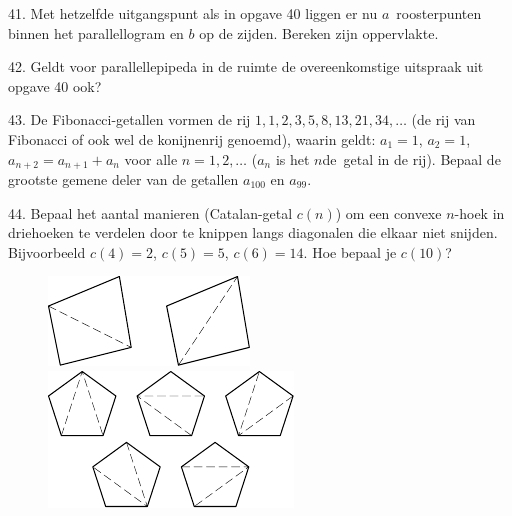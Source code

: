 \begin{problem}{41.}
	Met hetzelfde uitgangspunt als in opgave 40 liggen er nu $a$~roos\-terpunten binnen het parallellogram en $b$ op de zijden. Bereken zijn oppervlakte.
\end{problem}

\begin{problem}{42.}
	Geldt voor parallellepipeda in de ruimte de overeenkomstige uitspraak uit opgave 40 ook?
\end{problem}

\begin{problem}{43.}
	De Fibonacci-getallen vormen de rij $1,1,2,3,5,8,13,21,34,\dotsc$ (de rij van Fibonacci of ook wel de konijnenrij genoemd), waarin geldt: $a_1 = 1$, $a_2 = 1$, $a_{n+2}=a_{n+1}+a_n$ voor alle $n=1,2,\dotsc$ ($a_n$ is het $n$de~getal in de rij). Bepaal de grootste gemene deler van de getallen $a_{100}$ en $a_{99}$.
\end{problem}

\clearpage

\begin{problem}{44.}
	Bepaal het aantal manieren (Catalan-getal $c(n)$) om een convexe $n$-hoek in driehoeken te verdelen door te knippen langs diagonalen die elkaar niet snijden. Bijvoorbeeld $c(4)=2$, $c(5)=5$, $c(6)=14$. Hoe bepaal je $c(10)$?
	\begin{figure}
		\includegraphics{resources/taskbook-281}
		\qquad
		\includegraphics{resources/taskbook-282}
	\end{figure}
\end{problem}

